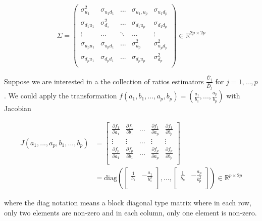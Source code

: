 \documentclass{article}
\theoremstyle{definition}
\begin{document}
\begin{equation*}
    \Sigma = \left(\begin{array}{ccccc}
        \sigma_{u_1}^2  & \sigma_{u_1d_1}  & ... & \sigma_{u_1,u_p} & \sigma_{u_1d_p} \\
        \sigma_{d_1u_1} & \sigma_{d_1}^2   &... & \sigma_{d_1u_p} &\sigma_{d_1d_p} \\
        \vdots   & ... & \ddots  & ... & \vdots  \\
        \sigma_{u_pu_1} & \sigma_{u_pd_1} & ... & \sigma_{u_p}^2  & \sigma_{u_pd_p}^2 \\
        \sigma_{d_pu_1} & \sigma_{d_pd_1} & ... & \sigma_{d_pu_p} & \sigma_{d_p}^2 \\
    \end{array}\right) \in \mathbb{R}^{2p\times 2p}
\end{equation*}

Suppose we are interested in a the collection of ratios estimators $\frac{\bar{U}_j}{\bar{D}_j}$ for $j=1,...,p$. We could apply the transformation $f(a_1,b_1,...,a_p,b_p) = \left(\frac{a_1}{b_1},...,\frac{a_p}{b_p}\right)$ with Jacobian

\begin{align*} 
J(a_1,...,a_p,b_1,...,b_p) &= \begin{bmatrix}
\frac{\partial f_1 }{\partial a_1} & \frac{\partial f_1 }{\partial b_1} & ... &  \frac{\partial f_1 }{\partial a_p}&  \frac{\partial f_1 }{\partial b_p}\\
\vdots  & \vdots &  ... & \vdots & \vdots  \\
\frac{\partial f_p }{\partial a_1} & \frac{\partial f_p }{\partial b_1} & ... &  \frac{\partial f_p }{\partial a_p}   & \frac{\partial f_p }{\partial b_p}\\
\end{bmatrix} \\ 
&= \text{diag}\left(\begin{bmatrix}
\frac{1}{b_1} & -\frac{a_1}{b_1^2} \\ 
\end{bmatrix},...,\begin{bmatrix}
\frac{1}{b_p} & -\frac{a_p}{b_p^2} \\ 
\end{bmatrix} \right) \in \mathbb{R}^{p\times 2p}
\end{align*}  

where the diag notation means a block diagonal type matrix where in each row, only two elements are non-zero and in each column, only one element is non-zero. 
\end{document}

